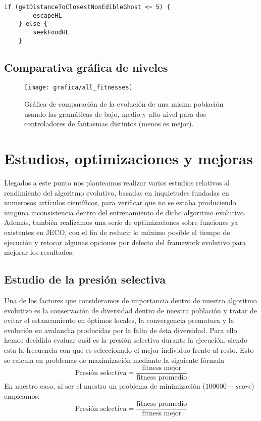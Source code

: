 \begin{lstlisting}[frame=single, breaklines=no, basicstyle=\fontsize{10}{11}\ttfamily, caption=Ejemplo de bot producido al evolucionar usando la gramática de alto nivel (mismo resultado entrenando tanto contra Random Ghosts como Legacy Ghosts).]
    if (getDistanceToClosestNonEdibleGhost <= 5) {
        escapeHL
    } else {
        seekFoodHL
    }
\end{lstlisting}

\subsection{Comparativa gráfica de niveles}
\begin{figure}[H]
\centering
\texttt{[image: grafica/all\_fitnesses]}
\label{grafica:comparacion-todas}
\caption{Gráfica de comparación de la evolución de una misma población usando las gramáticas de bajo, medio y alto nivel para dos controladores de fantasmas distintos (menos es mejor).}
\end{figure}

\section{Estudios, optimizaciones y mejoras}
Llegados a este punto nos planteamos realizar varios estudios relativos al rendimiento del algoritmo evolutivo, basadas en inquietudes fundadas en numerosos artículos científicos, para verificar que no se estaba produciendo ninguna inconsistencia dentro del entrenamiento de dicho algoritmo evolutivo. Además, también realizamos una serie de optimizaciones sobre funciones ya existentes en JECO, con el fin de reducir lo máximo posible el tiempo de ejecución y retocar algunas opciones por defecto del framework evolutivo para mejorar los resultados.

\subsection{Estudio de la presión selectiva}
Una de los factores que consideramos de importancia dentro de nuestro algoritmo evolutivo es la conservación de diversidad dentro de nuestra población y tratar de evitar el estancamiento en óptimos locales, la convergencia prematura y la evolución en avalancha producidas por la falta de ésta diversidad. Para ello hemos decidido evaluar cuál es la presión selectiva durante la ejecución, siendo esta la frecuencia con que es seleccionado el mejor individuo frente al resto. Esto se calcula en problemas de maximización mediante la siguiente fórmula
\begin{equation}
\textrm{Presión selectiva} = \frac{\textrm{fitness mejor}}{\textrm{fitness promedio}}
\end{equation}
En nuestro caso, al ser el nuestro un problema de minimización ($100000 - score$) empleamos:
\begin{equation}
\textrm{Presión selectiva} = \frac{\textrm{fitness promedio}}{\textrm{fitness mejor}}
\end{equation}


